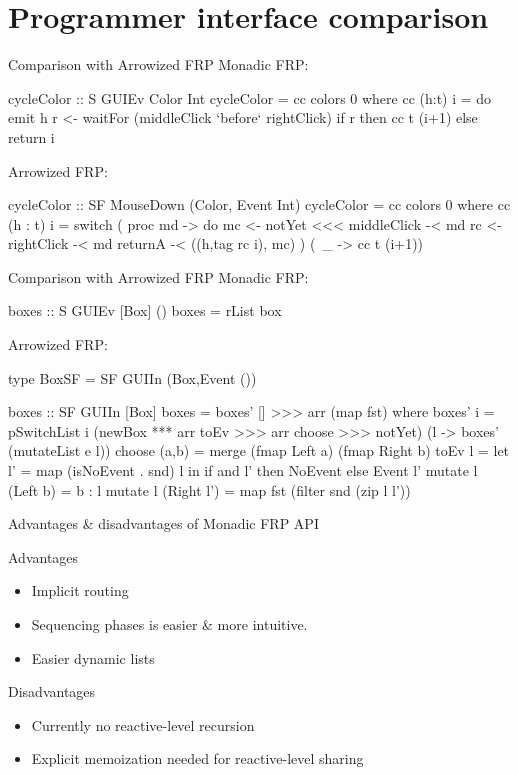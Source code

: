 \documentclass{beamer}
\begin{document}
\section{Programmer interface comparison}
\begin{frame}{Comparison with Arrowized FRP}
Monadic FRP:
\begin{code}
cycleColor :: S GUIEv Color Int
cycleColor = cc colors 0 where
  cc (h:t) i = do
    emit h
    r <- waitFor (middleClick `before` rightClick)
    if r then cc t (i+1) else return i
\end{code}
Arrowized FRP:
\begin{code}
cycleColor :: SF MouseDown (Color, Event Int)
cycleColor = cc colors 0 where
  cc (h : t) i = switch ( proc md -> do
      mc  <- notYet <<< middleClick  -< md
      rc  <- rightClick              -< md
      returnA -< ((h,tag rc i), mc)
    ) (\ _ -> cc t (i+1))
\end{code}

\end{frame}

\begin{frame}{Comparison with Arrowized FRP}
Monadic FRP:
\begin{code}
boxes :: S GUIEv [Box] ()
boxes = rList box
\end{code}
Arrowized FRP:
\begin{code}
type BoxSF  = SF GUIIn (Box,Event ())

boxes :: SF GUIIn [Box]
boxes = boxes' [] >>> arr (map fst) where
  boxes' i = pSwitchList i
    (newBox *** arr toEv >>> arr choose >>> notYet)
    (\e l -> boxes' (mutateList e l))
choose (a,b) = merge (fmap Left a) (fmap Right b)
toEv l =  let l' = map (isNoEvent . snd) l 
          in if and l' then NoEvent else Event l'
mutate l (Left b)   = b : l
mutate l (Right l') = map fst (filter snd (zip l l'))
\end{code}
\end{frame}

\begin{frame}{Advantages \& disadvantages of Monadic FRP API}
\begin{block}{Advantages}
\begin{itemize}
\item Implicit routing
\item Sequencing phases is easier \& more intuitive.
\item Easier dynamic lists 
\end{itemize}
\end{block}
\begin{block}{Disadvantages}
\begin{itemize}
\item Currently no reactive-level recursion
\item Explicit memoization needed for reactive-level sharing
\end{itemize}
\end{block}
\end{frame}
\end{document}
